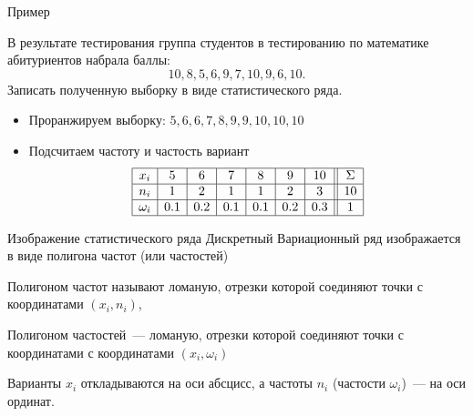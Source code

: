 \documentclass[unicode,11pt,notheorems,xcolor=table]{beamer}
\begin{document}
\begin{frame}{Пример}
    \begin{exampleblock}{}
        В результате тестирования группа студентов в тестированию по математике абитуриентов набрала баллы: 
        $$
            10, 8, 5, 6, 9, 7, 10, 9, 6,10.
        $$
        Записать полученную выборку в виде статистического ряда.   
    \end{exampleblock}
    \begin{itemize}
        \item Проранжируем выборку: $5,6,6,7,8,9,9,10,10,10$
        \item Подсчитаем частоту и частость вариант
        $$
        \begin{array}{|c|c|c|c|c|c|c||c|}
            \hline
            x_i & 5 & 6 & 7 & 8 & 9 & 10 & \Sigma\\
            \hline
            n_i & 1 & 2 & 1 & 1 & 2& 3& 10\\
            \hline
            \omega_i & 0.1 & 0.2 & 0.1 & 0.1 & 0.2& 0.3& 1\\
            \hline
        \end{array}
        $$
    \end{itemize}
\end{frame}
\begin{frame}{Изображение статистического ряда}{}
    Дискретный Вариационный ряд изображается  в виде  \alert{полигона} частот (или частостей)


    \alert{Полигоном частот} называют ломаную, отрезки которой соединяют точки с координатами $(x_i,n_i)$, 
    
    \bigskip 
    \alert{Полигоном частостей}~--- ломаную, отрезки которой соединяют точки с координатами  с координатами $(x_i,\omega_i)$


    \bigskip 
    Варианты $x_i$ откладываются на оси абсцисс, а частоты $n_i$ (частости $\omega_i$)~--- на оси ординат.

\end{frame}
\end{document}
